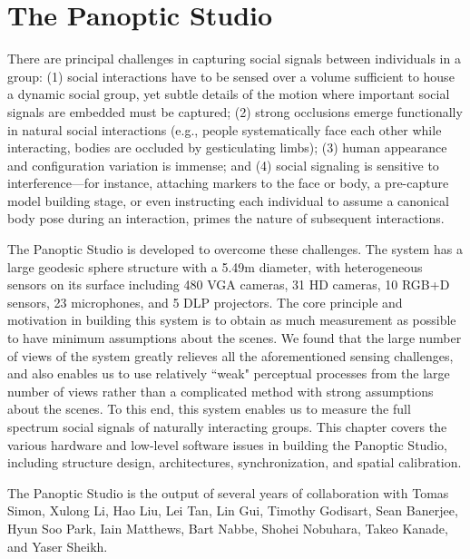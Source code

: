 \chapter{The Panoptic Studio}%
\label{chapter:system}

There are principal challenges in capturing social signals between individuals in a group: (1) social interactions have to be sensed over a volume sufficient to house a dynamic social group, yet subtle details of the motion where important social signals are embedded must be captured; (2) strong occlusions emerge functionally in natural social interactions (e.g., people systematically face each other while interacting, bodies are occluded by gesticulating limbs); (3) human appearance and configuration variation is immense; and (4) social signaling is sensitive to interference---for instance, attaching markers to the face or body, a pre-capture model building stage, or even instructing each individual to assume a canonical body pose during an interaction, primes the nature of subsequent interactions. 

The Panoptic Studio is developed to overcome these challenges. The system has a large geodesic sphere structure with a 5.49m diameter, with heterogeneous sensors on its surface including 480 VGA cameras, 31 HD cameras, 10 RGB+D sensors, 23 microphones, and 5 DLP projectors. The core principle and motivation in building this system is to obtain as much measurement as possible to have minimum assumptions about the scenes. We found that the large number of views of the system greatly relieves all the aforementioned sensing challenges, and also enables us to use relatively ``weak" perceptual processes from the large number of views rather than a complicated method with strong assumptions about the scenes. To this end, this system enables us to measure the full spectrum social signals of naturally interacting groups. This chapter covers the various hardware and low-level software issues in building the Panoptic Studio, including structure design, architectures, synchronization, and spatial calibration.  

The Panoptic Studio is the output of several years of collaboration with Tomas Simon, Xulong Li, Hao Liu, Lei Tan, Lin Gui, Timothy Godisart, Sean Banerjee, Hyun Soo Park, Iain Matthews, Bart Nabbe, Shohei Nobuhara, Takeo Kanade, and Yaser Sheikh. 

